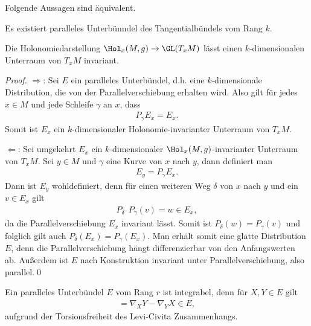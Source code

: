 \documentclass[%
	paper=a5,%
	fleqn,%
	DIV=18,%
	BCOR=0mm,
	fontsize=11pt,
	titlepage=false,%
	bibliography=totoc,
	DIV=18,%
	twoside=true,
	pdftitle=Riemannsche Geometrie,
	pdfauthor=Uwe Semmelmann,
	numbers=noendperiod]%
	{scrbook}
\begin{document}
\begin{prop}
\label{prop:Paralleles-Unterbündel-Invarianz-Holonomiedarstellung}
Folgende Aussagen sind äquivalent.
\begin{propenum}
\item Es existiert paralleles Unterbünndel des Tangentialbündels vom Rang $k$.
\item Die Holonomiedarstellung $\Hol_{x}(M,g) \to \GL(T_{x}M)$ lässt einen $k$-dimensionalen Unterraum von $T_{x}M$ invariant.\fish
\end{propenum}
\end{prop}
\begin{proof}
$\Rightarrow$: Sei $E$ ein paralleles Unterbündel, d.h. eine $k$-dimensionale Distribution, die von der Parallelverschiebung erhalten wird.
Also gilt für jedes $x\in M$ und jede Schleife $\gamma$ an $x$, dass
\begin{align*}
P_{\gamma} E_{x} = E_{x}.
\end{align*}
Somit ist $E_{x}$ ein $k$-dimensionaler Holonomie-invarianter Unterraum von $T_{x}M$.

$\Leftarrow$: Sei umgekehrt $E_{x}$ ein $k$-dimensionaler $\Hol_{x}(M,g)$-invarianter Unterraum von $T_{x}M$.
Sei $y\in M$ und $\gamma$ eine Kurve von $x$ nach $y$, dann definiert man
\begin{align*}
E_{y} = P_{\gamma} E_{x}.
\end{align*}
Dann ist $E_{y}$ wohldefiniert, denn für einen weiteren Weg $\delta$ von $x$ nach $y$ und ein $v\in E_{x}$ gilt
\begin{align*}
P_{\delta^-} P_{\gamma} (v) = w\in E_{x},
\end{align*}
da die Parallelverschiebung $E_{x}$ invariant lässt. Somit ist $P_{\delta}(w) = P_{\gamma}(v)$ und folglich gilt auch $P_{\delta}(E_{x}) = P_{\gamma}(E_{x})$. Man erhält somit eine glatte Distribution $E$, denn die  Parallelverschiebung hängt differenzierbar von den Anfangswerten ab. Außerdem ist $E$ nach Konstruktion invariant unter Parallelverschiebung, also parallel.\qed
\end{proof}

\begin{rem}
Ein paralleles Unterbündel $E$ vom Rang $r$ ist integrabel, denn für $X,Y\in E$ gilt
\begin{align*}
[X,Y] = \nabla_{X}Y - \nabla_{Y}X \in E,
\end{align*}
aufgrund der Torsionsfreiheit des Levi-Civita Zusammenhangs.\map
\end{rem}
\end{document}
